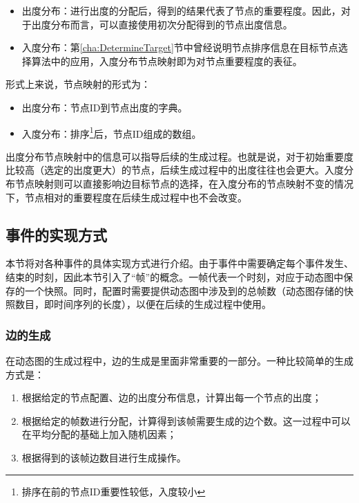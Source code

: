 \begin{itemize}
  \item 出度分布：进行出度的分配后，得到的结果代表了节点的重要程度。因此，对于出度分布而言，可以直接使用初次分配得到的节点出度信息。
  \item 入度分布：第\ref{cha:DetermineTarget}节中曾经说明节点排序信息在目标节点选择算法中的应用，入度分布节点映射即为对节点重要程度的表征。
\end{itemize}

\vspace{0.2cm}

形式上来说，节点映射的形式为：

\begin{itemize}
  \item 出度分布：节点ID到节点出度的字典。
  \item 入度分布：排序\footnote{排序在前的节点ID重要性较低，入度较小}后，节点ID组成的数组。
\end{itemize}

\vspace{0.2cm}

出度分布节点映射中的信息可以指导后续的生成过程。也就是说，对于初始重要度比较高（选定的出度更大）的节点，后续生成过程中的出度往往也会更大。入度分布节点映射则可以直接影响边目标节点的选择，在入度分布的节点映射不变的情况下，节点相对的重要程度在后续生成过程中也不会改变。

\subsection{事件的实现方式}

本节将对各种事件的具体实现方式进行介绍。由于事件中需要确定每个事件发生、结束的时刻，因此本节引入了“帧”的概念。一帧代表一个时刻，对应于动态图中保存的一个快照。同时，配置时需要提供动态图中涉及到的总帧数（动态图存储的快照数目，即时间序列的长度），以便在后续的生成过程中使用。

\subsubsection{边的生成}

在动态图的生成过程中，边的生成是里面非常重要的一部分。一种比较简单的生成方式是：

\begin{enumerate}
  \item 根据给定的节点配置、边的出度分布信息，计算出每一个节点的出度；
  \item 根据给定的帧数进行分配，计算得到该帧需要生成的边个数。这一过程中可以在平均分配的基础上加入随机因素；
  \item 根据得到的该帧边数目进行生成操作。
\end{enumerate}

